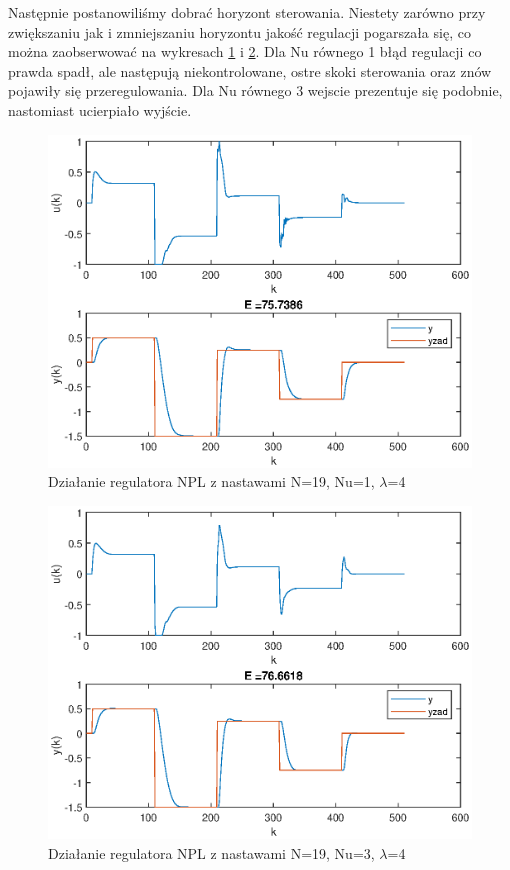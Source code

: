 		\newpage
		Następnie postanowiliśmy dobrać horyzont sterowania. Niestety zarówno przy zwiększaniu jak i zmniejszaniu horyzontu jakość regulacji pogarszała się, co można zaobserwować na wykresach \ref{fig:NPL3} i \ref{fig:NPL4}. Dla Nu równego 1 błąd regulacji co prawda spadł, ale następują niekontrolowane, ostre skoki sterowania oraz znów pojawiły się przeregulowania. Dla Nu równego 3 wejscie prezentuje się podobnie, nastomiast ucierpiało wyjście.
		
		\begin{figure}[h!]
			\centering
			\includegraphics[width=0.7\linewidth]{img/strojenieNPL_N_19_Nu_1_lam_4.eps}
			\caption{Działanie regulatora NPL z nastawami N=19, Nu=1, $\lambda$=4}
			\label{fig:NPL3}
		\end{figure}
		
		\begin{figure}[h!]
			\centering
			\includegraphics[width=\linewidth]{img/strojenieNPL_N_19_Nu_3_lam_4.eps}
			\caption{Działanie regulatora NPL z nastawami N=19, Nu=3, $\lambda$=4}
			\label{fig:NPL4}
		\end{figure}
		
